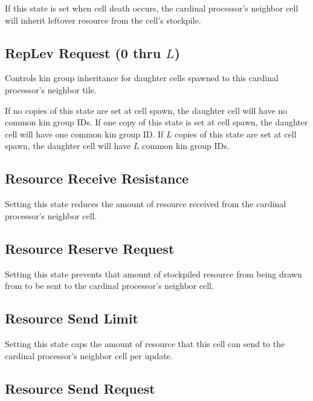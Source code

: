 
If this state is set when cell death occurs, the cardinal processor's neighbor cell will inherit leftover resource from the cell's stockpile.

\subsection{RepLev Request (0 thru $L$)}


Controls kin group inheritance for daughter cells spawned to this cardinal processor's neighbor tile.

If no copies of this state are set at cell spawn, the daughter cell will have no common kin group IDs.
If one copy of this state is set at cell spawn, the daughter cell will have one common kin group ID.
If $L$ copies of this state are set at cell spawn, the daughter cell will have $L$ common kin group IDs.

\subsection{Resource Receive Resistance}


Setting this state reduces the amount of resource received from the cardinal processor's neighbor cell.

\subsection{Resource Reserve Request}


Setting this state prevents that amount of stockpiled resource from being drawn from to be sent to the cardinal processor's neighbor cell.

\subsection{Resource Send Limit}


Setting this state caps the amount of resource that this cell can send to the cardinal processor's neighbor cell per update.

\subsection{Resource Send Request}

